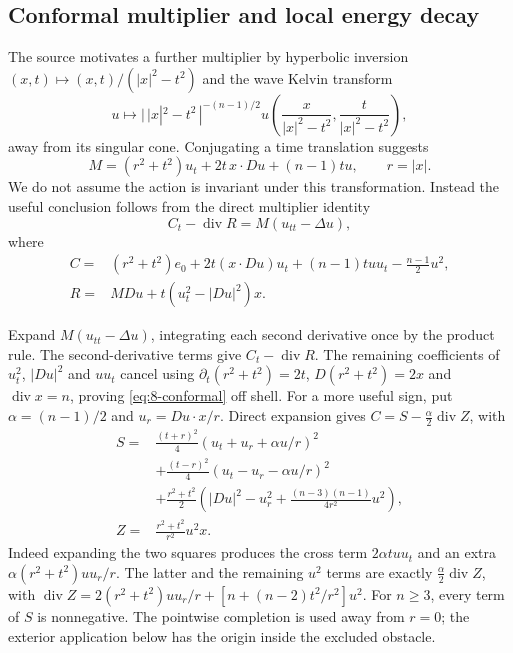 \subsection{Conformal multiplier and local energy decay}
The source motivates a further multiplier by hyperbolic inversion
$(x,t)\mapsto(x,t)/(|x|^2-t^2)$ and the wave Kelvin transform
\[
 u\mapsto |\,|x|^2-t^2\,|^{-(n-1)/2}
 u\left(\frac{x}{|x|^2-t^2},\frac{t}{|x|^2-t^2}\right),
\]
away from its singular cone. Conjugating a time translation suggests
\[
 M=(r^2+t^2)u_t+2t\,x\cdot Du+(n-1)tu,\qquad r=|x|.
\]
We do not assume the action is invariant under this transformation.
Instead the useful conclusion follows from the direct multiplier identity
\begin{equation}\label{eq:8-conformal}
 C_t-\operatorname{div}R=M(u_{tt}-\Delta u),
\end{equation}
where
\[
 \begin{split}
 C={}&(r^2+t^2)e_0+2t(x\cdot Du)u_t
               +(n-1)tuu_t-\tfrac{n-1}{2}u^2,\\
 R={}&MDu+t(u_t^2-|Du|^2)x.
 \end{split}
\]
\begin{expandedproof}
Expand $M(u_{tt}-\Delta u)$, integrating each second derivative once
by the product rule. The second-derivative terms give $C_t-\operatorname{div}R$.
The remaining coefficients of $u_t^2$, $|Du|^2$ and $uu_t$ cancel using
$\partial_t(r^2+t^2)=2t$, $D(r^2+t^2)=2x$ and
$\operatorname{div}x=n$, proving \eqref{eq:8-conformal} off shell.
For a more useful sign, put $\alpha=(n-1)/2$ and $u_r=Du\cdot x/r$.
Direct expansion gives $C=S-\frac\alpha2\operatorname{div}Z$, with
\[
 \begin{split}
 S={}&\frac{(t+r)^2}{4}(u_t+u_r+\alpha u/r)^2\\
 &+\frac{(t-r)^2}{4}(u_t-u_r-\alpha u/r)^2\\
 &+\frac{r^2+t^2}{2}\left(|Du|^2-u_r^2+
                      \frac{(n-3)(n-1)}{4r^2}u^2\right),\\
 Z={}&\frac{r^2+t^2}{r^2}u^2x.
 \end{split}
\]
Indeed expanding the two squares produces the cross term
$2\alpha t uu_t$ and an extra $\alpha(r^2+t^2)uu_r/r$.
The latter and the remaining $u^2$ terms are exactly
$\frac\alpha2\operatorname{div}Z$, with
$\operatorname{div}Z=2(r^2+t^2)uu_r/r+
[n+(n-2)t^2/r^2]u^2$.
For $n\geq3$, every term of $S$ is nonnegative.
The pointwise completion is used away from $r=0$; the exterior application
below has the origin inside the excluded obstacle.
\end{expandedproof}
\Needspace{55mm}

